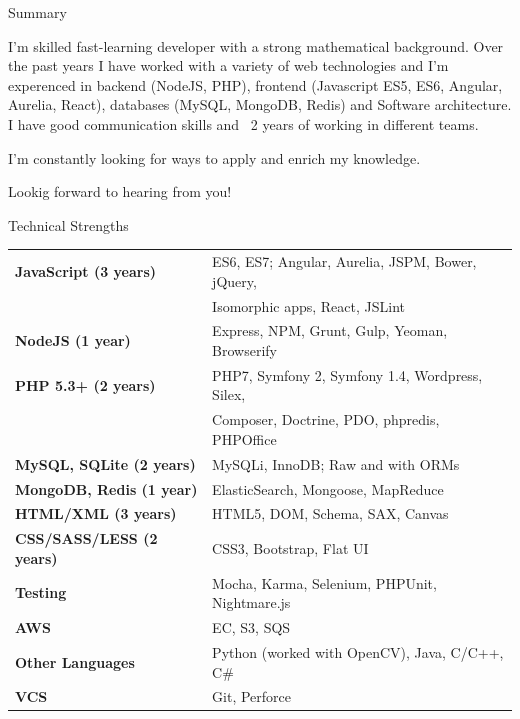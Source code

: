 \documentclass{resume} %
\begin{document}

\begin{rSection}{Summary}

I'm skilled fast-learning developer with a strong mathematical background. Over the past years I have worked with a variety of web technologies and I'm experenced in backend (NodeJS, PHP), frontend (Javascript ES5, ES6, Angular, Aurelia, React), databases (MySQL, MongoDB, Redis) and Software architecture. I have good communication skills and ~2 years of working in different teams.

I'm constantly looking for ways to apply and enrich my knowledge. 

Lookig forward to hearing from you!

\end{rSection}



\begin{rSection}{Technical Strengths}

\begin{tabular}{ @{} >{\bfseries}l @{\hspace{6ex}} l }
JavaScript (3 years) & ES6, ES7; Angular, Aurelia, JSPM, Bower, jQuery, \\
 & Isomorphic apps, React, JSLint \\
NodeJS (1 year) & Express, NPM, Grunt, Gulp, Yeoman, Browserify \\
PHP 5.3+ (2 years) & PHP7, Symfony 2, Symfony 1.4, Wordpress, Silex, \\
 & Composer, Doctrine, PDO, phpredis, PHPOffice \\
MySQL, SQLite (2 years) & MySQLi, InnoDB; Raw and with ORMs \\
MongoDB, Redis (1 year) & ElasticSearch, Mongoose, MapReduce \\
HTML/XML (3 years) & HTML5, DOM, Schema, SAX, Canvas \\
CSS/SASS/LESS (2 years) & CSS3, Bootstrap, Flat UI \\
Testing & Mocha, Karma, Selenium, PHPUnit, Nightmare.js \\
AWS & EC, S3, SQS  \\
Other Languages & Python (worked with OpenCV), Java, C/C++, C\# \\
VCS & Git, Perforce \\
\end{tabular}

\end{rSection}
\end{document}
